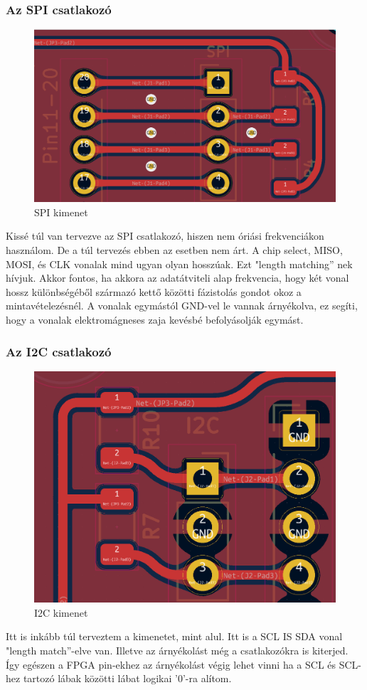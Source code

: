 \documentclass[a4paper,12pt,oneside]{book}
\begin{document}
\subsubsection{Az SPI csatlakozó}
\begin{figure}[H]
	\centering
	\includegraphics[trim=1mm 1mm 1mm 1mm,scale=0.33]{spi kimenet.PNG}
	\caption{SPI kimenet}
	\label{SPI kimenet}
\end{figure}
Kissé túl van tervezve az SPI csatlakozó, hiszen nem óriási frekvenciákon használom. De a túl tervezés ebben az esetben nem árt. A chip select, MISO, MOSI, és CLK vonalak mind ugyan olyan hosszúak. Ezt "length matching” nek hívjuk. Akkor fontos, ha akkora az adatátviteli alap frekvencia, hogy két vonal hossz különbségéből származó kettő közötti fázistolás gondot okoz a mintavételezésnél. A vonalak egymástól GND-vel le vannak árnyékolva, ez segíti, hogy a vonalak elektromágneses zaja kevésbé befolyásolják egymást.
\subsubsection{Az I2C csatlakozó}
\begin{figure}[H]
	\centering
	\includegraphics[trim=1mm 1mm 1mm 1mm,scale=0.45]{i2ckimenet.PNG}
	\caption{I2C kimenet}
	\label{I2C kimenet}
\end{figure}
Itt is inkább túl terveztem a kimenetet, mint alul. Itt is a SCL IS SDA vonal "length match”-elve van. Illetve az árnyékolást még a csatlakozókra is kiterjed. Így egészen a FPGA pin-ekhez az árnyékolást végig lehet vinni ha a SCL és SCL-hez tartozó lábak közötti lábat logikai ’0’-ra alítom.
\end{document}
